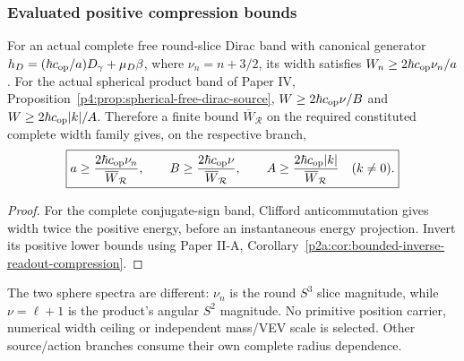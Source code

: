 \documentclass[12pt,a4paper]{article}
\begin{document}
\subsubsection{Evaluated positive compression bounds}
\begin{corollary}
\label{p8:cor:free-generator-radius-bounds}
For an actual complete free round-slice Dirac band with canonical generator
\(h_D=(\hbar c_{\rm op}/a)D_\gamma+\mu_D\beta\), where
\(\nu_n=n+3/2\), its width satisfies
\(W_n\geq2\hbar c_{\rm op}\nu_n/a\).
For the actual spherical product band of Paper IV,
Proposition~\ref{p4:prop:spherical-free-dirac-source},
\(W\geq2\hbar c_{\rm op}\nu/B\) and
\(W\geq2\hbar c_{\rm op}|k|/A\).
Therefore a finite bound \(\overline W_{\mathcal R}\) on the required
constituted complete width family gives, on the respective branch,
\begin{equation}
 \boxed{a\geq\frac{2\hbar c_{\rm op}\nu_n}{\overline W_{\mathcal R}},
 \qquad B\geq\frac{2\hbar c_{\rm op}\nu}{\overline W_{\mathcal R}},
 \qquad A\geq\frac{2\hbar c_{\rm op}|k|}{\overline W_{\mathcal R}}
 \quad(k\ne0).}
 \label{p8:eq:free-generator-radius-bounds}
\end{equation}
\end{corollary}
\begin{proof}
For the complete conjugate-sign band, Clifford anticommutation gives width
twice the positive energy, before an instantaneous energy projection.
Invert its positive lower bounds using Paper II-A,
Corollary~\ref{p2a:cor:bounded-inverse-readout-compression}.
\end{proof}
The two sphere spectra are different: \(\nu_n\) is the round \(S^3\)
slice magnitude, while \(\nu=\ell+1\) is the product's angular \(S^2\)
magnitude. No primitive position carrier, numerical width ceiling or
independent mass/VEV scale is selected. Other source/action branches consume
their own complete radius dependence.
\end{document}
